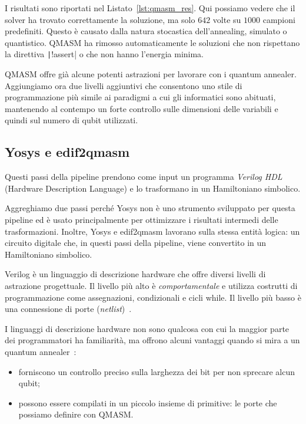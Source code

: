 I risultati sono riportati nel Listato~\ref{lst:qmasm_res}. Qui possiamo vedere che il solver ha trovato correttamente la soluzione, ma solo $642$ volte su $1000$ campioni predefiniti. Questo è causato dalla natura stocastica dell'annealing, simulato o quantistico. QMASM ha rimosso automaticamente le soluzioni che non rispettano la direttiva \texttt|!assert| o che non hanno l'energia minima.

\begin{listingenv}[h]
	\caption{Risultati della soddisfacibilità del circuito}
	\label{lst:qmasm_res}
\end{listingenv}

QMASM offre già alcune potenti astrazioni per lavorare con i quantum annealer. Aggiungiamo ora due livelli aggiuntivi che consentono uno stile di programmazione più simile ai paradigmi a cui gli informatici sono abituati, mantenendo al contempo un forte controllo sulle dimensioni delle variabili e quindi sul numero di qubit utilizzati.

\subsection{Yosys e edif2qmasm}
\label{sec:yosys_edif2qmasm}
Questi passi della pipeline prendono come input un programma \emph{Verilog HDL} (Hardware Description Language) e lo trasformano in un Hamiltoniano simbolico. 

Aggreghiamo due passi perché Yosys non è uno strumento sviluppato per questa pipeline ed è usato principalmente per ottimizzare i risultati intermedi delle trasformazioni. Inoltre, Yosys e edif2qmasm lavorano sulla stessa entità logica: un circuito digitale che, in questi passi della pipeline, viene convertito in un Hamiltoniano simbolico.

Verilog è un linguaggio di descrizione hardware che offre diversi livelli di astrazione progettuale. Il livello più alto è \emph{comportamentale} e utilizza costrutti di programmazione come assegnazioni, condizionali e cicli while. Il livello più basso è una connessione di porte (\emph{netlist})~\cite{gordon1995semantic}. 

I linguaggi di descrizione hardware non sono qualcosa con cui la maggior parte dei programmatori ha familiarità, ma offrono alcuni vantaggi quando si mira a un quantum annealer~\cite{pakin2019targeting}:
\begin{itemize}
	\item forniscono un controllo preciso sulla larghezza dei bit per non sprecare alcun qubit;
	\item possono essere compilati in un piccolo insieme di primitive: le porte che possiamo definire con QMASM.
\end{itemize}

